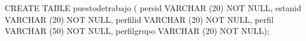 \lstset{caption=Crear tabla ``puestosdetrabajo'',label=sql:crearTablaPuestosdetrabajo}
\begin{SQL}
CREATE TABLE puestodetrabajo (
persid VARCHAR (20) NOT NULL,
estanid VARCHAR (20) NOT NULL,
perfilid VARCHAR (20) NOT NULL,
perfil VARCHAR (50) NOT NULL,
perfilgrupo VARCHAR (20) NOT NULL);
\end{SQL}
